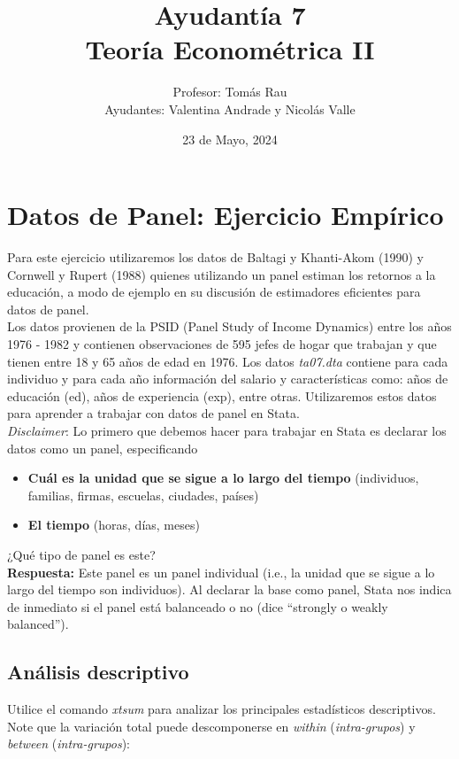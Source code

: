 \documentclass[11pt]{article}
\title{\textbf{Ayudantía 7 \\ \normalsize Teoría Econométrica II}}
\author{Profesor: Tomás Rau \\ Ayudantes: Valentina Andrade y Nicolás Valle}
\date{23 de Mayo, 2024}
\begin{document}
\maketitle
\thispagestyle{fancy}

 
\section{Datos de Panel: Ejercicio Empírico}

Para este ejercicio utilizaremos los datos de Baltagi y Khanti-Akom (1990) y Cornwell y Rupert (1988) quienes utilizando un panel estiman los retornos a la educación, a modo de ejemplo en su discusión de estimadores eficientes para datos de panel. \\

Los datos provienen de la PSID (Panel Study of Income Dynamics) entre los años 1976 - 1982 y contienen observaciones de 595 jefes de hogar que trabajan y que tienen entre 18 y 65 años de edad en 1976. Los datos \textit{ta07.dta} contiene para cada individuo y para cada año información del salario y características como: años de educación (ed), años de experiencia (exp), entre otras. Utilizaremos estos datos para aprender a trabajar con datos de panel en Stata. \\
 
\textit{Disclaimer}: Lo primero que debemos hacer para trabajar en Stata es declarar los datos como un panel, especificando

\begin{itemize}
\item \textbf{Cuál es la unidad que se sigue a lo largo del tiempo} (individuos, familias, firmas, escuelas, ciudades, países)
\item  \textbf{El tiempo} (horas, días, meses)
\end{itemize}

 ¿Qué tipo de panel es este? \\

\textbf{Respuesta:} Este panel es un panel individual (i.e., la unidad que se sigue a lo largo del tiempo son individuos). Al declarar la base como panel, Stata nos indica de inmediato si el panel está balanceado o no (dice ``strongly o weakly balanced''). 

\subsection{Análisis descriptivo}

Utilice el comando \textit{xtsum} para analizar los principales estadísticos descriptivos. Note que la variación total puede descomponerse en \textit{within} (\textit{intra-grupos}) y \textit{between} (\textit{intra-grupos}):
\end{document}

